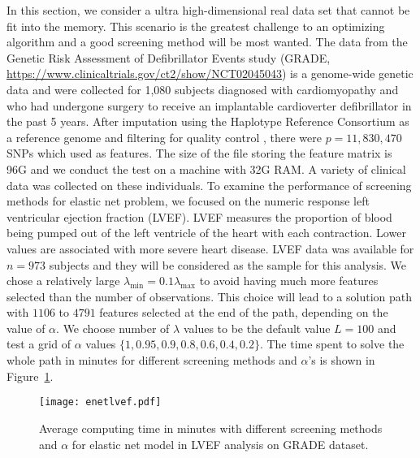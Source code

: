 In this section, we consider a ultra high-dimensional real data set that cannot be fit into the memory. This scenario is the greatest challenge to an optimizing algorithm and a good screening method will be most wanted. The data from the Genetic Risk Assessment of Defibrillator Events study (GRADE, \url{https://www.clinicaltrials.gov/ct2/show/NCT02045043}) is a genome-wide genetic data and were collected for 1,080 subjects diagnosed with cardiomyopathy and who had undergone surgery to receive an implantable cardioverter defibrillator in the past 5 years. After imputation using the Haplotype Reference Consortium as a reference genome and filtering for quality control \citep{Das2016}, there were $p=11,830,470$ SNPs which used as features. The size of the file storing the feature matrix is 96G and we conduct the test on a machine with 32G RAM. A variety of clinical data was collected on these individuals. To examine the performance of screening methods for elastic net problem, we focused on the numeric response left ventricular ejection fraction (LVEF). LVEF measures the proportion of blood being pumped out of the left ventricle of the heart with each contraction. Lower values are associated with more severe heart disease. LVEF data was available for $n=973$ subjects and they will be considered as the sample for this analysis. We chose a relatively large $\lambda_{\min} =0.1\lambda_{\max}$ to avoid having much more features selected than the number of observations. This choice will lead to a solution path with $1106$ to $4791$ features selected at the end of the path, depending on the value of $\alpha$. We choose number of $\lambda$ values to be the default value $L=100$ and test a grid of $\alpha$ values $\{1,0.95,0.9,0.8,0.6,0.4,0.2\}$. The time spent to solve the whole path in minutes for different screening methods and $\alpha$'s is shown in Figure~\ref{fig:lvef}. 

\begin{figure}[ht]
    \centering
    \texttt{[image: enetlvef.pdf]}    \caption[Comparison of screening methods for elastic net in LVEF analysis]{Average computing time in minutes with different screening methods and $\alpha$ for elastic net model in LVEF analysis on GRADE dataset.}
    \label{fig:lvef}
\end{figure}


